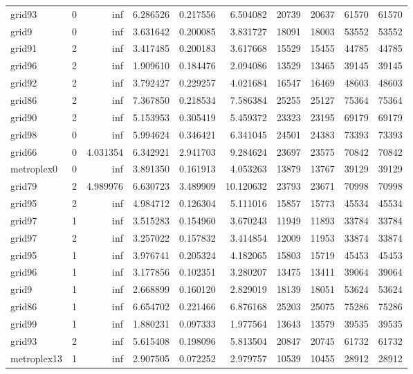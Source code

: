 \begin{longtable}{|l|r|r|r|r|r|r|r|r|r|}
grid93 & 0 & inf & 6.286526 & 0.217556 & 6.504082 & 20739 & 20637 & 61570 & 61570 \\
grid9 & 0 & inf & 3.631642 & 0.200085 & 3.831727 & 18091 & 18003 & 53552 & 53552 \\
grid91 & 2 & inf & 3.417485 & 0.200183 & 3.617668 & 15529 & 15455 & 44785 & 44785 \\
grid96 & 2 & inf & 1.909610 & 0.184476 & 2.094086 & 13529 & 13465 & 39145 & 39145 \\
grid92 & 2 & inf & 3.792427 & 0.229257 & 4.021684 & 16547 & 16469 & 48603 & 48603 \\
grid86 & 2 & inf & 7.367850 & 0.218534 & 7.586384 & 25255 & 25127 & 75364 & 75364 \\
grid90 & 2 & inf & 5.153953 & 0.305419 & 5.459372 & 23323 & 23195 & 69179 & 69179 \\
grid98 & 0 & inf & 5.994624 & 0.346421 & 6.341045 & 24501 & 24383 & 73393 & 73393 \\
grid66 & 0 & 4.031354 & 6.342921 & 2.941703 & 9.284624 & 23697 & 23575 & 70842 & 70842 \\
metroplex0 & 0 & inf & 3.891350 & 0.161913 & 4.053263 & 13879 & 13767 & 39129 & 39129 \\
grid79 & 2 & 4.989976 & 6.630723 & 3.489909 & 10.120632 & 23793 & 23671 & 70998 & 70998 \\
grid95 & 2 & inf & 4.984712 & 0.126304 & 5.111016 & 15857 & 15773 & 45534 & 45534 \\
grid97 & 1 & inf & 3.515283 & 0.154960 & 3.670243 & 11949 & 11893 & 33784 & 33784 \\
grid97 & 2 & inf & 3.257022 & 0.157832 & 3.414854 & 12009 & 11953 & 33874 & 33874 \\
grid95 & 1 & inf & 3.976741 & 0.205324 & 4.182065 & 15803 & 15719 & 45453 & 45453 \\
grid96 & 1 & inf & 3.177856 & 0.102351 & 3.280207 & 13475 & 13411 & 39064 & 39064 \\
grid9 & 1 & inf & 2.668899 & 0.160120 & 2.829019 & 18139 & 18051 & 53624 & 53624 \\
grid86 & 1 & inf & 6.654702 & 0.221466 & 6.876168 & 25203 & 25075 & 75286 & 75286 \\
grid99 & 1 & inf & 1.880231 & 0.097333 & 1.977564 & 13643 & 13579 & 39535 & 39535 \\
grid93 & 2 & inf & 5.615408 & 0.198096 & 5.813504 & 20847 & 20745 & 61732 & 61732 \\
metroplex13 & 1 & inf & 2.907505 & 0.072252 & 2.979757 & 10539 & 10455 & 28912 & 28912 \\

\end{longtable}
